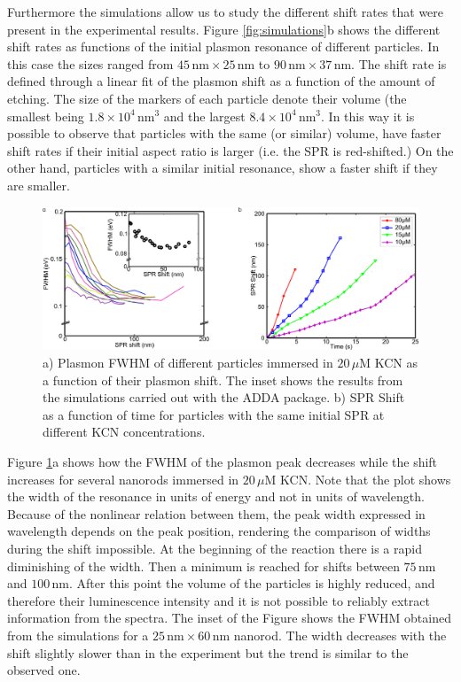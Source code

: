 \documentclass[a4paper,oneside,onecolumn]{article}
\newcommand{\nm}{\ensuremath{\,\textrm{nm}}}
\newcommand{\uM}{\ensuremath{\,\mu\textrm{M}}}
\begin{document}
Furthermore the simulations allow us to study the different shift rates that
were present in the experimental results. Figure \ref{fig:simulations}b shows the
different shift rates as functions of the initial plasmon resonance of different
particles. In this case the sizes ranged from $45\nm\times25\nm$ to
$90\nm\times37\nm$. The shift rate is defined through a linear fit of the
plasmon shift as a function of the amount of etching. The size of the markers of
each particle denote their volume (the smallest being $1.8\times10^4\nm^3$ and
the largest $8.4\times10^4\nm^3$. In this way it is possible to observe that
particles with the same (or similar) volume, have faster shift rates if their
initial aspect ratio is larger (i.e. the SPR is red-shifted.) On the other hand,
particles with a similar initial resonance, show a faster shift if they are
smaller. 


\begin{figure}[p]
 \centering
 \includegraphics[width=0.95\linewidth]{Figures/03_Shifts/shifts.png}
 \caption{a) Plasmon FWHM of different particles immersed in $20\uM$
 KCN as a function of their plasmon shift. The inset shows the results from the
 simulations carried out with the ADDA package. b) SPR Shift as a function of
 time for particles with the same initial SPR at different KCN concentrations.}
 \label{fig:FWHM}
\end{figure}

Figure \ref{fig:FWHM}a shows how the FWHM of the plasmon peak decreases while
the shift increases for several nanorods immersed in $20\uM$ KCN. Note that the
plot shows the width of the resonance in units of energy and not in units of
wavelength. Because of the nonlinear relation between them, the peak width
expressed in wavelength depends on the peak position, rendering the comparison
of widths during the shift impossible. At the beginning of the reaction there is
a rapid diminishing of the width. Then a minimum is reached for shifts between
$75\nm$ and $100\nm$. After this point the volume of the particles is highly
reduced, and therefore their luminescence intensity and it is not possible to
reliably extract information from the spectra. The inset of the Figure shows
the FWHM obtained from the simulations for a $25\nm\times60\nm$ nanorod. The
width decreases with the shift slightly slower than in the experiment but the
trend is similar to the observed one.
\end{document}
